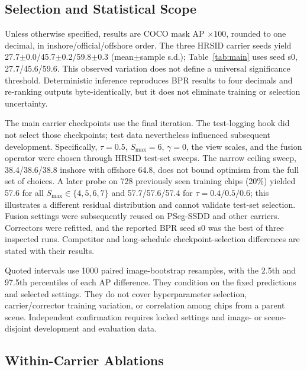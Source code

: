 \subsection{Selection and Statistical Scope}\label{sec:exp:eval}
Unless otherwise specified, results are COCO mask AP $\times100$, rounded to one decimal, in inshore/official/offshore order. The three HRSID carrier seeds yield 27.7$\pm$0.0/45.7$\pm$0.2/59.8$\pm$0.3 (mean$\pm$sample s.d.); Table~\ref{tab:main} uses seed s0, 27.7/45.6/59.6. This observed variation does not define a universal significance threshold. Deterministic inference reproduces BPR results to four decimals and re-ranking outputs byte-identically, but it does not eliminate training or selection uncertainty.

The main carrier checkpoints use the final iteration. The test-logging hook did not select those checkpoints; test data nevertheless influenced subsequent development. Specifically, $\tau=0.5$, $S_{\max}=6$, $\gamma=0$, the view scales, and the fusion operator were chosen through HRSID test-set sweeps. The narrow ceiling sweep, 38.4/38.6/38.8 inshore with offshore 64.8, does not bound optimism from the full set of choices. A later probe on 728 previously seen training chips (20\%) yielded 57.6 for all $S_{\max}\in\{4,5,6,7\}$ and 57.7/57.6/57.4 for $\tau=0.4/0.5/0.6$; this illustrates a different residual distribution and cannot validate test-set selection. Fusion settings were subsequently reused on PSeg-SSDD and other carriers. Correctors were refitted, and the reported BPR seed s0 was the best of three inspected runs. Competitor and long-schedule checkpoint-selection differences are stated with their results.

Quoted intervals use 1000 paired image-bootstrap resamples, with the 2.5th and 97.5th percentiles of each AP difference. They condition on the fixed predictions and selected settings. They do not cover hyperparameter selection, carrier/corrector training variation, or correlation among chips from a parent scene. Independent confirmation requires locked settings and image- or scene-disjoint development and evaluation data.

\subsection{Within-Carrier Ablations}\label{sec:exp:ablation}


